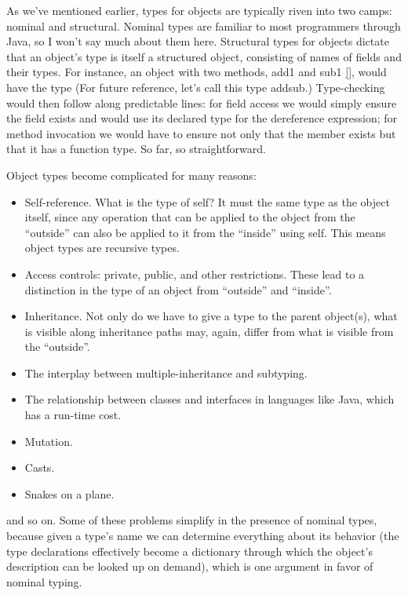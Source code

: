 
As we’ve mentioned earlier, types for objects are typically riven into two
camps: nominal and structural. Nominal types are familiar to most programmers
through Java, so I won’t say much about them here. Structural types for objects
dictate that an object’s type is itself a structured object, consisting of names
of fields and their types. For instance, an object with two methods, add1 and
sub1 \ref{}, would have the type
(For future reference, let’s call this type addsub.) Type-checking would then
follow along predictable lines: for field access we would simply ensure the
field exists and would use its declared type for the dereference expression; for
method invocation we would have to ensure not only that the member exists but
that it has a function type. So far, so straightforward.

Object types become complicated for many reasons:
\begin{itemize}
  \item 
Self-reference. What is the type of self? It must the same type as the object
itself, since any operation that can be applied to the object from the “outside”
can also be applied to it from the “inside” using self. This means object types
are recursive types.
  \item 
Access controls: private, public, and other restrictions. These lead to a
distinction in the type of an object from “outside” and “inside”.
  \item 
Inheritance. Not only do we have to give a type to the parent object(s), what is
visible along inheritance paths may, again, differ from what is visible from the
“outside”.
  \item 
The interplay between multiple-inheritance and subtyping.
  \item 
The relationship between classes and interfaces in languages like Java, which
has a run-time cost.
  \item 
Mutation.
  \item 
Casts.
  \item 
Snakes on a plane.
\end{itemize}
and so on. Some of these problems simplify in the presence of nominal types,
because given a type’s name we can determine everything about its behavior (the
type declarations effectively become a dictionary through which the object’s
description can be looked up on demand), which is one argument in favor of
nominal typing.

